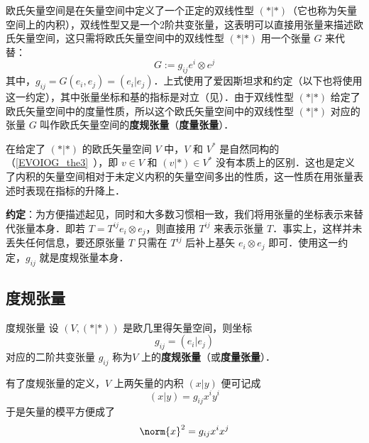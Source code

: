 
欧氏矢量空间是在矢量空间中定义了一个正定的双线性型 $(*|*)$（它也称为矢量空间上的内积），双线性型又是一个2阶共变张量，这表明可以直接用张量来描述欧氏矢量空间，这只需将欧氏矢量空间中的双线性型 $(*|*)$ 用一个张量 $G$ 来代替：
\begin{equation}
G:=g_{ij} e^i\otimes e^j
\end{equation}
其中，$g_{ij}=G(e_i,e_j)=(e_i|e_j)$．上式使用了爱因斯坦求和约定（以下也将使用这一约定），其中张量坐标和基的指标是对立（见）．由于双线性型 $(*|*)$ 给定了欧氏矢量空间中的度量性质，所以这个欧氏矢量空间中的双线性型 $(*|*)$ 对应的张量 $G$ 叫作欧氏矢量空间的\textbf{度规张量}（\textbf{度量张量}）．

在给定了 $(*|*)$ 的欧氏矢量空间 $V$ 中，$V$ 和 $V^*$ 是自然同构的（\autoref{EVOIOG_the3}~），即 $v\in V $ 和 $(v|*)\in V^*$ 没有本质上的区别．这也是定义了内积的矢量空间相对于未定义内积的矢量空间多出的性质，这一性质在用张量表述时表现在指标的升降上．

\textbf{约定}：为方便描述起见，同时和大多数习惯相一致，我们将用张量的坐标表示来替代张量本身．即若 $T=T^{ij} e_{i}\otimes e_{j}$，则直接用 $T^{ij}$ 来表示张量 $T$．事实上，这样并未丢失任何信息，要还原张量 $T$ 只需在 $T^{ij}$ 后补上基矢 $e_{i}\otimes e_{j}$ 即可．使用这一约定，$g_{ij}$ 就是度规张量本身．
\subsection{度规张量}
\begin{definition}{度规张量}
设 $(V,(*|*))$ 是欧几里得矢量空间，则坐标
\begin{equation}
g_{ij}=(e_i|e_j)
\end{equation}
对应的二阶共变张量 $g_{ij}$ 称为$V$ 上的\textbf{度规张量}（或\textbf{度量张量}）．
\end{definition}
有了度规张量的定义，$V$ 上两矢量的内积 $(x|y)$ 便可记成
\begin{equation}
(x|y)=g_{ij}x^i y^i
\end{equation}
于是矢量的模平方便成了
\begin{equation}
\norm{x}^2=g_{ij}x^i x^j
\end{equation}

